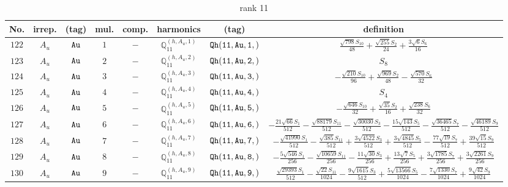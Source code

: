 \documentclass[fleqn,8pt]{jsarticle}
\begin{document}
\begin{table}[ht!]
\begin{center}
\caption{rank 11}
\renewcommand{\arraystretch}{1.3}
\begin{tabular}{cccccccc} \hline \hline
No. & irrep. & (tag) & mul. & comp. & harmonics & (tag) & definition \\ \hline
$ 122 $ & $ A_{u} $ & $ {\tt Au} $ & $ 1 $ & $ - $ & $ \mathbb{Q}_{11}^{(h,A_{u},1)} $ & $ {\tt Qh(11,Au,1,)} $ & $ \frac{\sqrt{798} S_{10}}{48} + \frac{\sqrt{255} S_{2}}{24} + \frac{3 \sqrt{6} S_{6}}{16} $ \\
$ 123 $ & $ A_{u} $ & $ {\tt Au} $ & $ 2 $ & $ - $ & $ \mathbb{Q}_{11}^{(h,A_{u},2)} $ & $ {\tt Qh(11,Au,2,)} $ & $ S_{8} $ \\
$ 124 $ & $ A_{u} $ & $ {\tt Au} $ & $ 3 $ & $ - $ & $ \mathbb{Q}_{11}^{(h,A_{u},3)} $ & $ {\tt Qh(11,Au,3,)} $ & $ - \frac{\sqrt{210} S_{10}}{96} + \frac{\sqrt{969} S_{2}}{48} - \frac{\sqrt{570} S_{6}}{32} $ \\
$ 125 $ & $ A_{u} $ & $ {\tt Au} $ & $ 4 $ & $ - $ & $ \mathbb{Q}_{11}^{(h,A_{u},4)} $ & $ {\tt Qh(11,Au,4,)} $ & $ S_{4} $ \\
$ 126 $ & $ A_{u} $ & $ {\tt Au} $ & $ 5 $ & $ - $ & $ \mathbb{Q}_{11}^{(h,A_{u},5)} $ & $ {\tt Qh(11,Au,5,)} $ & $ - \frac{\sqrt{646} S_{10}}{32} + \frac{\sqrt{35} S_{2}}{16} + \frac{\sqrt{238} S_{6}}{32} $ \\
$ 127 $ & $ A_{u} $ & $ {\tt Au} $ & $ 6 $ & $ - $ & $ \mathbb{Q}_{11}^{(h,A_{u},6)} $ & $ {\tt Qh(11,Au,6,)} $ & $ - \frac{21 \sqrt{66} S_{1}}{512} - \frac{\sqrt{88179} S_{11}}{512} - \frac{\sqrt{30030} S_{3}}{512} - \frac{15 \sqrt{143} S_{5}}{512} - \frac{\sqrt{36465} S_{7}}{512} - \frac{\sqrt{46189} S_{9}}{512} $ \\
$ 128 $ & $ A_{u} $ & $ {\tt Au} $ & $ 7 $ & $ - $ & $ \mathbb{Q}_{11}^{(h,A_{u},7)} $ & $ {\tt Qh(11,Au,7,)} $ & $ - \frac{\sqrt{41990} S_{1}}{512} - \frac{\sqrt{385} S_{11}}{512} + \frac{3 \sqrt{4522} S_{3}}{512} + \frac{3 \sqrt{4845} S_{5}}{512} - \frac{77 \sqrt{19} S_{7}}{512} + \frac{39 \sqrt{15} S_{9}}{512} $ \\
$ 129 $ & $ A_{u} $ & $ {\tt Au} $ & $ 8 $ & $ - $ & $ \mathbb{Q}_{11}^{(h,A_{u},8)} $ & $ {\tt Qh(11,Au,8,)} $ & $ - \frac{5 \sqrt{546} S_{1}}{256} - \frac{\sqrt{10659} S_{11}}{256} - \frac{11 \sqrt{30} S_{3}}{256} + \frac{13 \sqrt{7} S_{5}}{256} + \frac{3 \sqrt{1785} S_{7}}{256} + \frac{3 \sqrt{2261} S_{9}}{256} $ \\
$ 130 $ & $ A_{u} $ & $ {\tt Au} $ & $ 9 $ & $ - $ & $ \mathbb{Q}_{11}^{(h,A_{u},9)} $ & $ {\tt Qh(11,Au,9,)} $ & $ \frac{\sqrt{29393} S_{1}}{512} - \frac{\sqrt{22} S_{11}}{1024} - \frac{9 \sqrt{1615} S_{3}}{512} + \frac{5 \sqrt{13566} S_{5}}{1024} - \frac{7 \sqrt{1330} S_{7}}{1024} + \frac{9 \sqrt{42} S_{9}}{1024} $ \\

\end{tabular}
\end{center}
\end{table}
\end{document}
